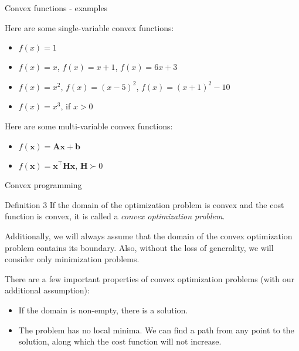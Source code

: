 \documentclass{beamer}
\begin{document}
\begin{frame}{Convex functions - examples}
\begin{flushleft}

Here are some single-variable convex functions: 

\begin{itemize}
    \item $f(x) = 1$
    \item $f(x) = x$, $f(x) = x + 1$, $f(x) = 6x + 3$
    \item $f(x) = x^2$, $f(x) = (x - 5)^2$, $f(x) = (x + 1)^2 - 10$
    \item $f(x) = x^3$, if $x > 0$
\end{itemize}

\bigskip

Here are some multi-variable convex functions: 

\begin{itemize}
    \item $f(\mathbf{x}) = \mathbf{A}\mathbf{x} + \mathbf{b}$
    \item $f(\mathbf{x}) = \mathbf{x}^\top \mathbf{H}\mathbf{x}$, $\mathbf{H} \succ 0$ 
\end{itemize}

\end{flushleft}
\end{frame}



\begin{frame}{Convex programming}
\begin{flushleft}

\begin{block}{Definition 3}
If the domain of the optimization problem is convex and the cost function is convex, it is called a \emph{convex optimization problem}.
\end{block}

\bigskip

Additionally, we will always assume that the domain of the convex optimization problem contains its boundary. Also, without the loss of generality, we will consider only minimization problems.

\bigskip

There are a few important properties of convex optimization problems (with our additional assumption):

\begin{itemize}
    \item If the domain is non-empty, there is a solution.
    \item The problem has no local minima. We can find a path from any point to the solution, along which the cost function will not increase.
\end{itemize}

\end{flushleft}
\end{frame}
\end{document}

